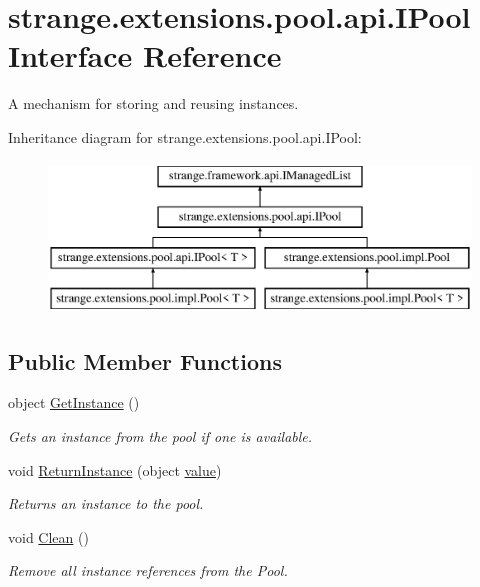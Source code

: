 \hypertarget{interfacestrange_1_1extensions_1_1pool_1_1api_1_1_i_pool}{\section{strange.\-extensions.\-pool.\-api.\-I\-Pool Interface Reference}
\label{interfacestrange_1_1extensions_1_1pool_1_1api_1_1_i_pool}
}


A mechanism for storing and reusing instances.  


Inheritance diagram for strange.\-extensions.\-pool.\-api.\-I\-Pool\-:\begin{figure}[H]
\begin{center}
\leavevmode
\includegraphics[height=4.000000cm]{interfacestrange_1_1extensions_1_1pool_1_1api_1_1_i_pool}
\end{center}
\end{figure}
\subsection*{Public Member Functions}
\begin{DoxyCompactItemize}
\item 
object \hyperlink{interfacestrange_1_1extensions_1_1pool_1_1api_1_1_i_pool_a07042ef56c57b6a5569de6360196ab11}{Get\-Instance} ()
\begin{DoxyCompactList}\small\item\em Gets an instance from the pool if one is available. \end{DoxyCompactList}\item 
void \hyperlink{interfacestrange_1_1extensions_1_1pool_1_1api_1_1_i_pool_a00d776e7b4f1735e7da8026c7ec7386c}{Return\-Instance} (object \hyperlink{interfacestrange_1_1framework_1_1api_1_1_i_managed_list_a563724c81cc8fe5ec08025fe94e9f351}{value})
\begin{DoxyCompactList}\small\item\em Returns an instance to the pool. \end{DoxyCompactList}\item 
void \hyperlink{interfacestrange_1_1extensions_1_1pool_1_1api_1_1_i_pool_a4cbaa845454117ccec8389a27642a9b0}{Clean} ()
\begin{DoxyCompactList}\small\item\em Remove all instance references from the Pool. \end{DoxyCompactList}\end{DoxyCompactItemize}
